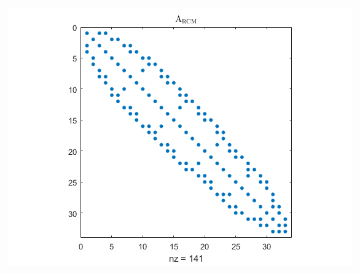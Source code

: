 \documentclass[12pt,a4paper]{article}
\begin{document}
\begin{figure}[H]
	\hspace{-8mm}
	\begin{subfigure}[b]{0.79\textwidth}
		\hspace{-8mm}
		\includegraphics[width=\textwidth]{images/ARCM.png}
	\end{subfigure}
	\hspace{-10mm}
	\begin{subfigure}[b]{0.21\textwidth}
		\hspace{-10mm}

\end{subfigure}
\end{figure}
\end{document}
